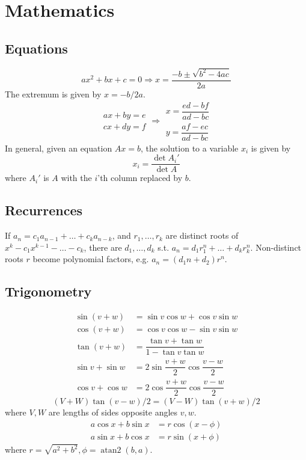 
\chapter{Mathematics}

\section{Equations}
\[
    ax^2+bx+c=0 \Rightarrow x = \frac{-b\pm\sqrt{b^2-4ac}}{2a}
\]
The extremum is given by $x = -b/2a$.
\[
    \begin{aligned}
        ax+by=e\\
        cx+dy=f
    \end{aligned}
    \Rightarrow
    \begin{aligned}
        x=\dfrac{ed-bf}{ad-bc}\\
        y=\dfrac{af-ec}{ad-bc}
    \end{aligned}
\]
In general, given an equation $Ax = b$, the solution to a variable $x_i$ is given by
\[
    x_i = \frac{\det A_i'}{\det A} 
\]
where $A_i'$ is $A$ with the $i$'th column replaced by $b$.

\section{Recurrences}
If $a_n = c_1 a_{n-1} + \dots + c_k a_{n-k}$, and $r_1, \dots, r_k$ are distinct roots of $x^k - c_1 x^{k-1} - \dots - c_k$, there are $d_1, \dots, d_k$ s.t. $ a_n = d_1r_1^n + \dots + d_kr_k^n.$
Non-distinct roots $r$ become polynomial factors, e.g. $a_n = (d_1n + d_2)r^n$.

\section{Trigonometry}
\begin{align*}
    \sin(v+w)&{}=\sin v\cos w+\cos v\sin w\\
    \cos(v+w)&{}=\cos v\cos w-\sin v\sin w\\
    \tan(v+w)&{}=\dfrac{\tan v+\tan w}{1-\tan v\tan w}\\
    \sin v+\sin w&{}=2\sin\dfrac{v+w}{2}\cos\dfrac{v-w}{2}\\
    \cos v+\cos w&{}=2\cos\dfrac{v+w}{2}\cos\dfrac{v-w}{2}
\end{align*}
\[ 
    (V+W)\tan(v-w)/2{}=(V-W)\tan(v+w)/2 
\]
where $V, W$ are lengths of sides opposite angles $v, w$.
\begin{align*}
	a\cos x+b\sin x&=r\cos(x-\phi)\\
	a\sin x+b\cos x&=r\sin(x+\phi)
\end{align*}
where $r=\sqrt{a^2+b^2}, \phi=\operatorname{atan2}(b,a)$.

